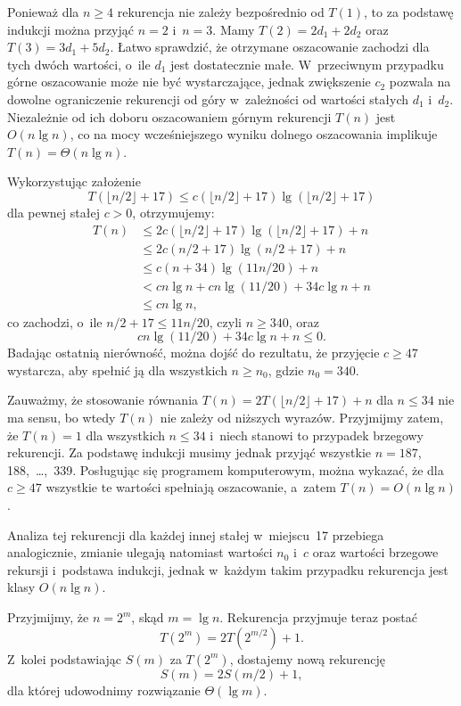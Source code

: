 Ponieważ dla $n\ge4$ rekurencja nie zależy bezpośrednio od $T(1)$, to za podstawę indukcji można przyjąć $n=2$ i~$n=3$. Mamy $T(2)=2d_1+2d_2$ oraz $T(3)=3d_1+5d_2$. Łatwo sprawdzić, że otrzymane oszacowanie zachodzi dla tych dwóch wartości, o~ile $d_1$ jest dostatecznie małe. W~przeciwnym przypadku górne oszacowanie może nie być wystarczające, jednak zwiększenie $c_2$ pozwala na dowolne ograniczenie rekurencji od góry w~zależności od wartości stałych $d_1$ i~$d_2$. Niezależnie od ich doboru oszacowaniem górnym rekurencji $T(n)$ jest $O(n\lg n)$, co na mocy wcześniejszego wyniku dolnego oszacowania implikuje $T(n)=\Theta(n\lg n)$.

\exercise %
Wykorzystując założenie
\[
	T(\lfloor n/2\rfloor+17) \le c(\lfloor n/2\rfloor+17)\lg(\lfloor n/2\rfloor+17)
\]
dla pewnej stałej $c>0$, otrzymujemy:
\begin{align*}
	T(n) &\le 2c(\lfloor n/2\rfloor+17)\lg(\lfloor n/2\rfloor+17)+n \\
	&\le 2c(n/2+17)\lg(n/2+17)+n \\
	&\le c(n+34)\lg(11n/20)+n \\
	&< cn\lg n+cn\lg(11/20)+34c\lg n+n \\
	&\le cn\lg n,
\end{align*}
co zachodzi, o~ile $n/2+17\le 11n/20$, czyli $n\ge340$, oraz
\[
	cn\lg(11/20)+34c\lg n+n \le 0.
\]
Badając ostatnią nierówność, można dojść do rezultatu, że przyjęcie $c\ge47$ wystarcza, aby spełnić ją dla wszystkich $n\ge n_0$, gdzie $n_0=340$.

Zauważmy, że stosowanie równania $T(n)=2T(\lfloor n/2\rfloor+17)+n$ dla $n\le34$ nie ma sensu, bo wtedy $T(n)$ nie zależy od niższych wyrazów. Przyjmijmy zatem, że $T(n)=1$ dla wszystkich $n\le34$ i~niech stanowi to przypadek brzegowy rekurencji. Za podstawę indukcji musimy jednak przyjąć wszystkie $n=187$, 188,~\dots,~339. Posługując się programem komputerowym, można wykazać, że dla $c\ge47$ wszystkie te wartości spełniają oszacowanie, a~zatem $T(n)=O(n\lg n)$.

Analiza tej rekurencji dla każdej innej stałej w~miejscu~17 przebiega analogicznie, zmianie ulegają natomiast wartości $n_0$ i~$c$ oraz wartości brzegowe rekursji i~podstawa indukcji, jednak w~każdym takim przypadku rekurencja jest klasy $O(n\lg n)$.

\exercise %
Przyjmijmy, że $n=2^m$, skąd $m=\lg n$. Rekurencja przyjmuje teraz postać
\[
	T(2^m) = 2T(2^{m/2})+1.
\]
Z~kolei podstawiając $S(m)$ za $T(2^m)$, dostajemy nową rekurencję
\[
	S(m) = 2S(m/2)+1,
\]
dla której udowodnimy rozwiązanie $\Theta(\lg m)$.

